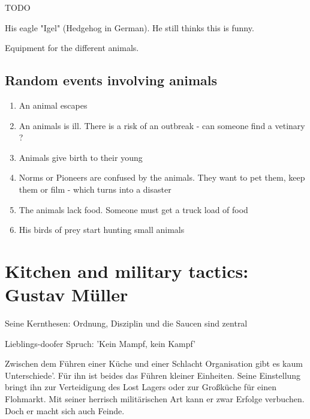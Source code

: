 \begin{npcBox}[title=Jonas Ohnesorg]
    \begin{consequences}
    \item {}
    \item {}
    \item {}
    \end{consequences}

    \begin{npcDescription}
    TODO
    \end{npcDescription}


    \begin{equipment}
    \item His eagle "Igel" (Hedgehog in German). He still thinks this is funny.
    \item Equipment for the different animals.
    \end{equipment}
\end{npcBox}


\subsection{Random events involving animals}

\begin{enumerate}
\item An animal escapes
\item An animals is ill. There is a risk of an outbreak - can someone find a vetinary ?
\item Animals give birth to their young
\item Norms or Pioneers are confused by the animals. They want to pet them, keep them or film - which turns into a disaster
\item The animals lack food. Someone must get a truck load of food
\item His birds of prey start hunting small animals
\end{enumerate}

\newpage
\section{Kitchen and military tactics: Gustav Müller}

Seine Kernthesen: Ordnung, Disziplin und die Saucen sind zentral

Lieblings-doofer Spruch: 'Kein Mampf, kein Kampf'


Zwischen dem Führen einer Küche und einer Schlacht Organisation gibt es kaum Unterschiede'. Für ihn ist beides das Führen kleiner Einheiten. Seine Einstellung bringt ihn zur Verteidigung des Lost Lagers oder zur Großküche für einen Flohmarkt. Mit seiner herrisch militärischen Art kann er zwar Erfolge verbuchen. Doch er macht sich auch Feinde.

